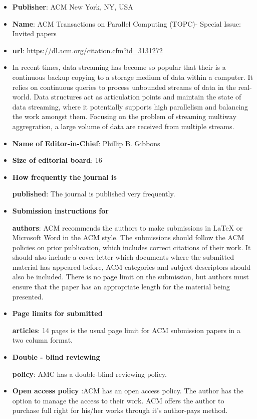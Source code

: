 \documentclass[11pt,twocolumn]{article}
\begin{document}
\begin{itemize}
   \item {\bf{Publisher}}: ACM New York, NY, USA
    \item {\bf{Name}}: ACM Transactions on Parallel Computing (TOPC)- Special Issue: Invited papers
     \item {\bf{url}}: \url{https://dl.acm.org/citation.cfm?id=3131272}
      \item In recent times, data streaming has become so popular that their is a continuous backup copying to a storage medium of data within a computer. It relies on continuous queries to process unbounded streams of data in the real-world. Data structures act as articulation points and maintain the state of data streaming, where it potentially supports high parallelism and balancing the work amongst them. Focusing on the problem of streaming multiway aggregration, a large volume of data are received from multiple streams.
       \item {\bf{Name of Editor-in-Chief}}: Phillip B. Gibbons
        \item {\bf{Size of editorial board}}: 16
	\item {\bf{How frequently the journal is }}

{\bf{published}}: The journal is published very frequently.
	 \item {\bf{Submission instructions for}}

{\bf{authors}}: ACM recommends the authors to make submissions in {\LaTeX} or Microsoft Word in the ACM style. The submissions should follow the ACM policies on prior publication, which includes correct citations of their work. It should also include a cover letter which documents where the submitted material has appeared before, ACM categories and subject descriptors should also be included. There is no page limit on the submission, but authors must ensure that the paper has an appropriate length for the material being presented. 

	  \item {\bf{Page limits for submitted}}

{\bf{ articles}}: 14 pages is the usual page limit for ACM submission papers in a two column format.

	   \item {\bf{Double - blind reviewing}}

{\bf{policy}}: AMC has a double-blind reviewing policy.

	    \item {\bf{Open access policy}} :ACM has an open access policy. The author has the option to manage the access to their work. ACM offers the author to purchase full right for his/her works through it's author-pays method.


\end{itemize}
\end{document}

